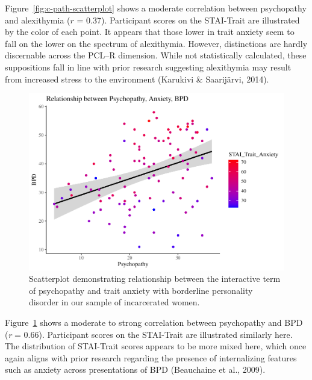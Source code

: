 \documentclass[
  man,floatsintext]{apa7}
\begin{document}
Figure~\ref{fig:c-path-scatterplot} shows a moderate correlation between psychopathy and alexithymia (\(r\) = 0.37). Participant scores on the STAI-Trait are illustrated by the color of each point. It appears that those lower in trait anxiety seem to fall on the lower on the spectrum of alexithymia. However, distinctions are hardly discernable across the PCL--R dimension. While not statistically calculated, these suppositions fall in line with prior research suggesting alexithymia may result from increased stress to the environment (Karukivi \& Saarijärvi, 2014).



\begin{figure}
\includegraphics[width=1\linewidth]{d2m-Psychopathy_files/figure-latex/a-path-scatterplot-1} \caption{Scatterplot demonstrating relationship between the interactive term of psychopathy and trait anxiety with borderline personality disorder in our sample of incarcerated women.}\label{fig:a-path-scatterplot}
\end{figure}

Figure~\ref{fig:a-path-scatterplot} shows a moderate to strong correlation between psychopathy and BPD (\emph{r} = 0.66). Participant scores on the STAI-Trait are illustrated similarly here. The distribution of STAI-Trait scores appears to be more mixed here, which once again aligns with prior research regarding the presence of internalizing features such as anxiety across presentations of BPD (Beauchaine et al., 2009).
\end{document}
